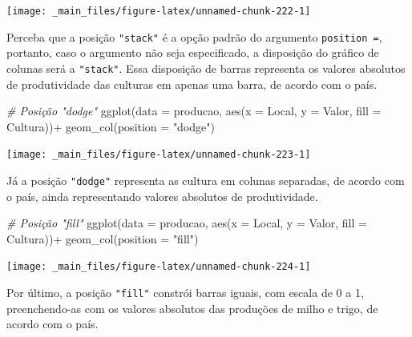 \documentclass[
  brazilian,
]{book}
\newenvironment{Shaded}{\begin{snugshade}}{\end{snugshade}}
\newcommand{\AttributeTok}[1]{\textcolor[rgb]{0.77,0.63,0.00}{#1}}
\newcommand{\CommentTok}[1]{\textcolor[rgb]{0.56,0.35,0.01}{\textit{#1}}}
\newcommand{\FunctionTok}[1]{\textcolor[rgb]{0.00,0.00,0.00}{#1}}
\newcommand{\NormalTok}[1]{#1}
\newcommand{\SpecialCharTok}[1]{\textcolor[rgb]{0.00,0.00,0.00}{#1}}
\newcommand{\StringTok}[1]{\textcolor[rgb]{0.31,0.60,0.02}{#1}}
\begin{document}
\begin{center}\texttt{[image: \_main\_files/figure-latex/unnamed-chunk-222-1]} \end{center}

Perceba que a posição \texttt{"stack"} é a opção padrão do argumento \texttt{position\ =}, portanto, caso o argumento não seja especificado, a disposição do gráfico de colunas será a \texttt{"stack"}. Essa disposição de barras representa os valores absolutos de produtividade das culturas em apenas uma barra, de acordo com o país.

\begin{Shaded}
\begin{Highlighting}[]
\CommentTok{\# Posição "dodge"}
\FunctionTok{ggplot}\NormalTok{(}\AttributeTok{data =}\NormalTok{ producao,}
       \FunctionTok{aes}\NormalTok{(}\AttributeTok{x =}\NormalTok{ Local,}
           \AttributeTok{y =}\NormalTok{ Valor,}
           \AttributeTok{fill =}\NormalTok{ Cultura))}\SpecialCharTok{+}
  \FunctionTok{geom\_col}\NormalTok{(}\AttributeTok{position =} \StringTok{"dodge"}\NormalTok{)}
\end{Highlighting}
\end{Shaded}

\begin{center}\texttt{[image: \_main\_files/figure-latex/unnamed-chunk-223-1]} \end{center}

Já a posição \texttt{"dodge"} representa as cultura em colunas separadas, de acordo com o país, ainda representando valores absolutos de produtividade.

\begin{Shaded}
\begin{Highlighting}[]
\CommentTok{\# Posição "fill"}
\FunctionTok{ggplot}\NormalTok{(}\AttributeTok{data =}\NormalTok{ producao,}
       \FunctionTok{aes}\NormalTok{(}\AttributeTok{x =}\NormalTok{ Local,}
           \AttributeTok{y =}\NormalTok{ Valor,}
           \AttributeTok{fill =}\NormalTok{ Cultura))}\SpecialCharTok{+}
  \FunctionTok{geom\_col}\NormalTok{(}\AttributeTok{position =} \StringTok{"fill"}\NormalTok{)}
\end{Highlighting}
\end{Shaded}

\begin{center}\texttt{[image: \_main\_files/figure-latex/unnamed-chunk-224-1]} \end{center}

Por último, a posição \texttt{"fill"} constrói barras iguais, com escala de 0 a 1, preenchendo-as com os valores absolutos das produções de milho e trigo, de acordo com o país.
\end{document}
